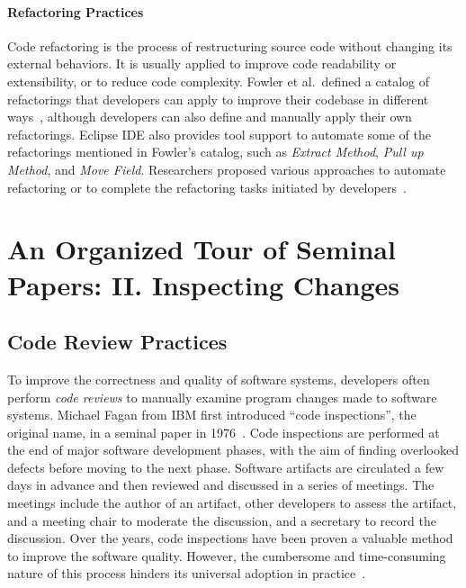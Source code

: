 \documentclass[runningheads,a4paper]{llncs}
\begin{document}
\paragraph{Refactoring Practices} 
Code refactoring is the process of restructuring source code without changing its external behaviors. It is usually applied to improve code readability or extensibility, or to reduce code complexity. 
Fowler et al.~defined a catalog of refactorings that developers can apply to improve their codebase in different ways~\cite{1999:RID}, although developers can also define and manually apply their own refactorings. Eclipse IDE also provides tool support to automate some of the refactorings mentioned in Fowler's catalog, such as \emph{Extract Method}, \emph{Pull up Method}, and \emph{Move Field}. Researchers proposed various approaches to automate refactoring or to complete the refactoring tasks initiated by developers~\cite{Griswold:1992,Balazinska1999,Dig:2009,Ge:2012,Chen:2013,Lee:2013,Tsantalis2013:icsm,Meng:2015,Kim:2016}.

\section{An Organized Tour of Seminal Papers: II. Inspecting Changes}
\label{sec:inspect}

\subsection{Code Review Practices}
To improve the correctness and quality of software systems, developers often perform {\em code reviews} to manually examine program changes made to software systems. Michael Fagan from IBM first introduced ``code inspections'', the original name, in a seminal paper in 1976~\cite{fagan2001design}. Code inspections are performed at the end of major software development phases, with the aim of finding overlooked defects before moving to the next phase. Software artifacts are circulated a few days in advance and then reviewed and discussed in a series of meetings. The meetings include the author of an artifact, other developers to assess the artifact, and a meeting chair to moderate the discussion, and a secretary to record the discussion. Over the years, code inspections have been proven a valuable method to improve the software quality. However, the cumbersome and time-consuming nature of this process hinders its universal adoption in practice~\cite{johnson1998reengineering}. 
\end{document}
